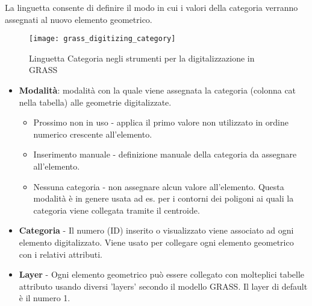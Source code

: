 
La linguetta  consente di definire il modo in cui i valori
della categoria verranno assegnati al nuovo elemento geometrico.

\begin{figure}[h]
 \begin{center}
  \caption{Linguetta Categoria negli strumenti per la digitalizzazione in GRASS \nixcaption}\label{fig:grass_digitizing_category}
  \texttt{[image: grass\_digitizing\_category]}
 \end{center}
\end{figure}

\begin{itemize}
\item \textbf{Modalità}: modalità con la quale viene assegnata la categoria
(colonna cat nella tabella) alle geometrie digitalizzate.
\begin{itemize}
\item Prossimo non in uso - applica il primo valore non utilizzato in ordine
numerico crescente all'elemento.
\item Inserimento manuale - definizione manuale della categoria da assegnare
all'elemento.
\item Nessuna categoria - non assegnare alcun valore all'elemento. Questa
modalità è in genere usata ad es. per i contorni dei poligoni ai quali la
categoria viene collegata tramite il centroide.
\end{itemize}
\item \textbf{Categoria} - Il numero (ID) inserito o visualizzato viene
associato ad ogni elemento digitalizzato. Viene usato per collegare ogni
elemento geometrico con i relativi attributi.
\item \textbf{Layer} - Ogni elemento geometrico può essere collegato
con molteplici tabelle attributo usando diversi 'layers' secondo il
modello GRASS. Il layer di default è il numero 1. 
\end{itemize}

\begin{Tip}\caption{\textsc{Creare un 'layer' GRASS aggiuntivo con QGIS}}
\end{Tip}

